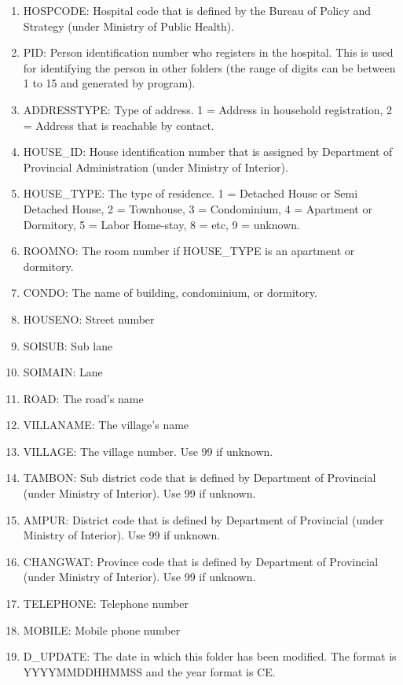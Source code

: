 \begin{enumerate}
  \item HOSPCODE: Hospital code that is defined by the Bureau of Policy and Strategy (under Ministry of Public Health). 
  \item PID: Person identification number who registers in the hospital. This is used for identifying the person in other folders (the range of digits can be between 1 to 15 and generated by program).
  \item ADDRESSTYPE: Type of address. 1 = Address in household registration, 2 = Address that is reachable by contact.
  \item HOUSE\_ID: House identification number that is assigned by Department of Provincial Administration (under Ministry of Interior).
  \item HOUSE\_TYPE: The type of residence. 1 = Detached House or Semi Detached House, 2 = Townhouse, 3 = Condominium, 4 = Apartment or Dormitory, 5 = Labor Home-stay, 8 = etc, 9 = unknown.
  \item ROOMNO: The room number if HOUSE\_TYPE is an apartment or dormitory.
  \item CONDO: The name of building, condominium, or dormitory.
  \item HOUSENO: Street number
  \item SOISUB: Sub lane
  \item SOIMAIN: Lane
  \item ROAD: The road's name
  \item VILLANAME: The village's name
  \item VILLAGE: The village number. Use 99 if unknown.
  \item TAMBON: Sub district code that is defined by Department of Provincial (under Ministry of Interior). Use 99 if unknown.
  \item AMPUR: District code that is defined by Department of Provincial (under Ministry of Interior). Use 99 if unknown.
  \item CHANGWAT: Province code that is defined by Department of Provincial (under Ministry of Interior). Use 99 if unknown.
  \item TELEPHONE: Telephone number
  \item MOBILE: Mobile phone number
  \item D\_UPDATE: The date in which this folder has been modified. The format is YYYYMMDDHHMMSS and the year format is CE.
\end{enumerate}